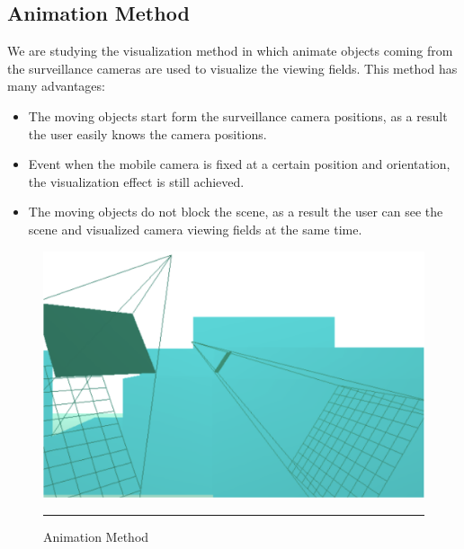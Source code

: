 \subsection{Animation Method}

We are studying the visualization method in which animate objects coming from the surveillance cameras are used to visualize the viewing fields. This method has  many advantages:

\begin{itemize}
	\item The moving objects start form the surveillance camera positions, as a result the user easily knows the camera positions.
	\item Event when the mobile camera is fixed at a certain position and orientation, the visualization effect is still achieved.
	\item The moving objects do not block the scene, as a result the user can see the scene and visualized camera viewing fields at the same time.
\end{itemize}

\begin{figure}[htbp]
	\centering
	\includegraphics{./Primitives/theory_animation.png}
	\rule{35em}{0.5pt}
	\caption[Animation Method]{Animation Method}
	\label{fig:AnimationMethod}
\end{figure}
